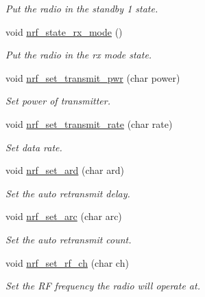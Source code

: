 \begin{DoxyCompactItemize}
\begin{DoxyCompactList}\small\item\em Put the radio in the standby 1 state. \end{DoxyCompactList}\item 
void \hyperlink{group___user_func_gab6c009513f9cf48b9d4beed89e9a2a61}{nrf\+\_\+state\+\_\+rx\+\_\+mode} ()\hypertarget{group___user_func_gab6c009513f9cf48b9d4beed89e9a2a61}{}\label{group___user_func_gab6c009513f9cf48b9d4beed89e9a2a61}

\begin{DoxyCompactList}\small\item\em Put the radio in the rx mode state. \end{DoxyCompactList}\item 
void \hyperlink{group___user_func_gab6847a9be46161756478ac38a091a755}{nrf\+\_\+set\+\_\+transmit\+\_\+pwr} (char power)
\begin{DoxyCompactList}\small\item\em Set power of transmitter. \end{DoxyCompactList}\item 
void \hyperlink{group___user_func_ga62bbc3e318cd92552d65d9ce240c595c}{nrf\+\_\+set\+\_\+transmit\+\_\+rate} (char rate)
\begin{DoxyCompactList}\small\item\em Set data rate. \end{DoxyCompactList}\item 
void \hyperlink{group___user_func_ga8322aaf437804fcd531291a1684906d9}{nrf\+\_\+set\+\_\+ard} (char ard)
\begin{DoxyCompactList}\small\item\em Set the auto retransmit delay. \end{DoxyCompactList}\item 
void \hyperlink{group___user_func_ga7501b4fa31eba5ad34aed21b18bb2a72}{nrf\+\_\+set\+\_\+arc} (char arc)
\begin{DoxyCompactList}\small\item\em Set the auto retransmit count. \end{DoxyCompactList}\item 
void \hyperlink{group___user_func_ga4bf48d64e99c204f20b6fe7c75b703c6}{nrf\+\_\+set\+\_\+rf\+\_\+ch} (char ch)
\begin{DoxyCompactList}\small\item\em Set the RF frequency the radio will operate at. \end{DoxyCompactList}\item 

\end{DoxyCompactItemize}
